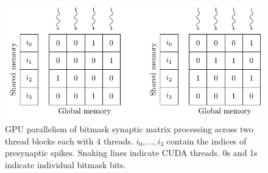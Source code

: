 \documentclass[utf8]{frontiersSCNS} %
\begin{document}
\begin{figure}
    \begin{center}
        \includegraphics{figures/bitmask}
    \end{center}
    \caption{GPU parallelism of bitmask synaptic matrix processing across two thread blocks each with \num{4} threads.
    $i_{0},\ldots,i_{3}$ contain the indices of presynaptic spikes.
    Snaking lines indicate CUDA threads.
    0s and 1s indicate individual bitmask bits.}
    \label{fig:bitmask}
\end{figure}
\end{document}

